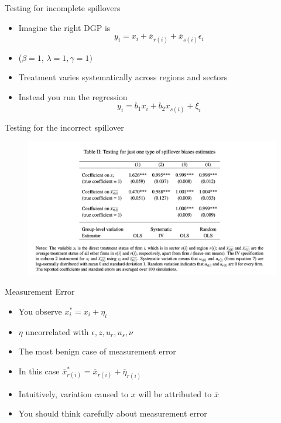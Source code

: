 \documentclass[english,xcolor=svgnames]{beamer}
\begin{document}
\begin{frame}{Testing for incomplete spillovers}
\begin{itemize}
\item Imagine the right DGP is
\[y_i = x_i + \overline{x}_{r(i)} + \overline{x}_{s(i)} \epsilon_i\]
\item ($\beta = 1$, $\lambda = 1, \gamma = 1)$
\item Treatment varies systematically across regions and sectors
\item Instead you run the regression
\[y_i = b_1 x_i + b_2 \overline{x}_{s(i)} + \xi_i\]
\end{itemize}
\end{frame}


\begin{frame}{Testing for the incorrect spillover}
\begin{figure}
\includegraphics[scale=0.35]{figures/h_ge_7}
\end{figure}
\end{frame}

\begin{frame}{Measurement Error}
\begin{itemize}
\item You observe $x^*_i = x_i + \eta_i$
\item $\eta$ uncorrelated with $\epsilon, z, u_r, u_s,\nu$
\item The most benign case of measurement error
\item In this case $\overline{x}^*_{r(i)} = \overline{x}_{r(i)} + \overline{\eta}_{r(i)}$
\item Intuitively, variation caused to $x$ will be attributed to $\overline{x}$
\item You should think carefully about measurement error
\end{itemize}
\end{frame}
\end{document}
